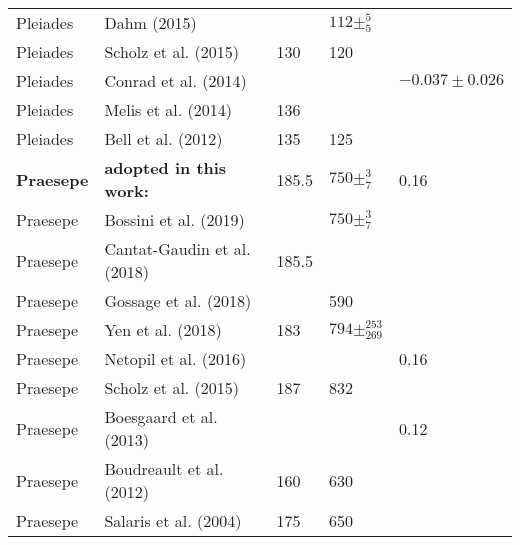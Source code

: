 \begin{table*}
\begin{tabular}{lllll}
 Pleiades    &             Dahm (2015)               &               &  $ 112       \pm _{ 5}^{5         }$ &                              \\
 Pleiades    &             Scholz et al. (2015)      &     130       &                           120        &                              \\
 Pleiades    &             Conrad et al. (2014)      &               &                                      &  $ -0.037        \pm 0.026 $ \\
 Pleiades    &             Melis et al. (2014)       &     136       &                                      &                              \\
 Pleiades    &             Bell et al. (2012)        &     135       &                           125        &                              \\\hline
\textbf{Praesepe} & \textbf{adopted in this work:}   &     185.5     &  $ 750\pm _{7}^{ 3 }$                &              0.16            \\
 Praesepe    &             Bossini et al. (2019)     &               &                 $ 750\pm _{7}^{ 3 }$ &                              \\
 Praesepe    &           Cantat-Gaudin et al. (2018) &     185.5     &                                      &                              \\
 Praesepe    &             Gossage et al. (2018)     &               &                           590        &                              \\
 Praesepe    &             Yen et al. (2018)         &     183       &  $ 794       \pm _{ 269}^{253     }$ &                              \\
 Praesepe    &             Netopil et al. (2016)     &               &                                      &               0.16           \\
 Praesepe    &             Scholz et al. (2015)      &     187       &                           832        &                              \\
 Praesepe    &             Boesgaard et al. (2013)   &               &                                      &               0.12           \\
 Praesepe    &             Boudreault et al. (2012)  &     160       &                           630        &                              \\
 Praesepe    &             Salaris et al. (2004)     &     175       &                           650        &                              \\\hline

\end{tabular}
\end{table*}
